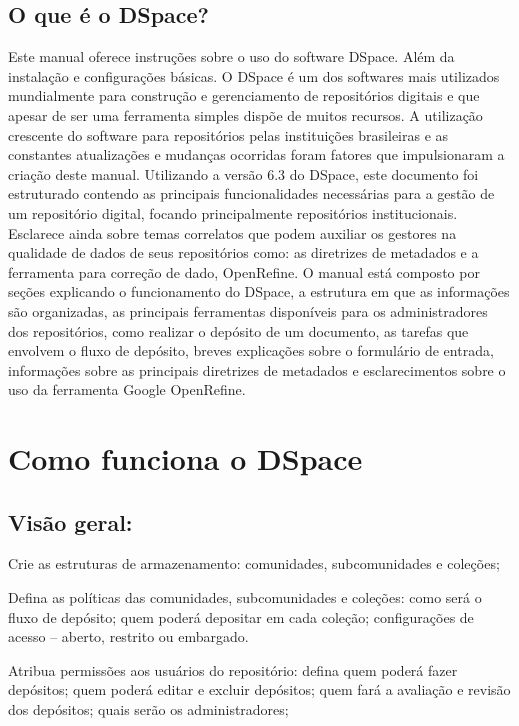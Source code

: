 \documentclass[12pt,hidelinks]{article}
\begin{document}
    \subsection{O que é o DSpace?}
        Este manual oferece instruções sobre o uso do software DSpace. Além da instalação e configurações básicas.
        O DSpace é um dos softwares mais utilizados mundialmente para construção e gerenciamento de repositórios digitais e que apesar de ser uma ferramenta simples dispõe de muitos recursos.
        \singlespacing
        A utilização crescente do software para repositórios pelas instituições brasileiras e as constantes atualizações e mudanças ocorridas foram fatores que impulsionaram a criação deste manual. 
         \singlespacing
         Utilizando a versão 6.3 do DSpace, este documento foi estruturado contendo as principais funcionalidades necessárias para a gestão de um repositório digital, focando principalmente repositórios institucionais. Esclarece ainda sobre temas correlatos que podem auxiliar os gestores na qualidade de dados de seus repositórios como: as diretrizes de metadados e a ferramenta para correção de dado, OpenRefine.
        \singlespacing
        O manual está composto por seções explicando o funcionamento do DSpace, a estrutura em que as informações são organizadas, as principais ferramentas disponíveis para os administradores dos repositórios, como realizar o depósito de um documento, as tarefas que envolvem o fluxo de depósito, breves explicações sobre o formulário de entrada, informações sobre as principais diretrizes de metadados e esclarecimentos sobre o uso da ferramenta Google OpenRefine.
\newpage
        \singlespacing
\section{Como funciona o DSpace}
\newpage
    \subsection{Visão geral:}
        \singlespacing \textbullet \hspace{6pt} Crie as estruturas de armazenamento: comunidades, subcomunidades e coleções;
        
        \textbullet \hspace{6pt} Defina as políticas das comunidades, subcomunidades e coleções: como será o fluxo de depósito; quem poderá depositar em cada coleção; configurações de acesso – aberto, restrito ou embargado.

        \textbullet \hspace{6pt} Atribua permissões aos usuários do repositório: defina quem poderá fazer depósitos; quem poderá editar e excluir depósitos; quem fará a avaliação e revisão dos depósitos; quais serão os administradores;
\end{document}
